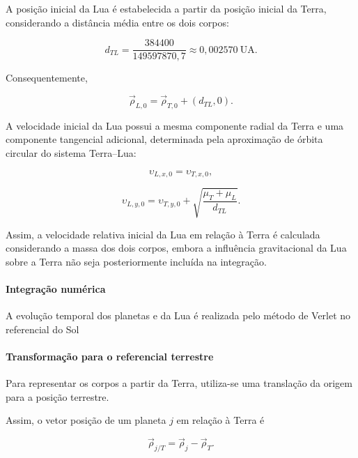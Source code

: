 \documentclass[12pt,a4paper]{article}
\begin{document}
A posição inicial da Lua é estabelecida a partir da posição inicial da Terra, considerando a distância média entre os dois corpos:

\begin{equation}
    d_{TL}=
    \frac{384400}{149597870,7}
    \approx0,002570\ \mathrm{UA}.
\end{equation}

Consequentemente,

\begin{equation}
    \vec{\rho}_{L,0}
    =
    \vec{\rho}_{T,0}+(d_{TL},0).
\end{equation}

A velocidade inicial da Lua possui a mesma componente radial da Terra e uma componente tangencial adicional, determinada pela aproximação de órbita circular do sistema Terra--Lua:

\begin{equation}
    \upsilon_{L,x,0}=\upsilon_{T,x,0},
\end{equation}

\begin{equation}
    \upsilon_{L,y,0}
    =
    \upsilon_{T,y,0}
    +
    \sqrt{\frac{\mu_T+\mu_L}{d_{TL}}}.
\end{equation}

Assim, a velocidade relativa inicial da Lua em relação à Terra é calculada considerando a massa dos dois corpos, embora a influência gravitacional da Lua sobre a Terra não seja posteriormente incluída na integração.

\paragraph{Integração numérica}

A evolução temporal dos planetas e da Lua é realizada pelo método de Verlet no referencial do Sol

\paragraph{Transformação para o referencial terrestre}

Para representar os corpos a partir da Terra, utiliza-se uma translação da origem para a posição terrestre.

Assim, o vetor posição de um planeta $j$ em relação à Terra é

\begin{equation}
    \vec{\rho}_{j/T}
    =
    \vec{\rho}_j-\vec{\rho}_T.
\end{equation}
\end{document}
